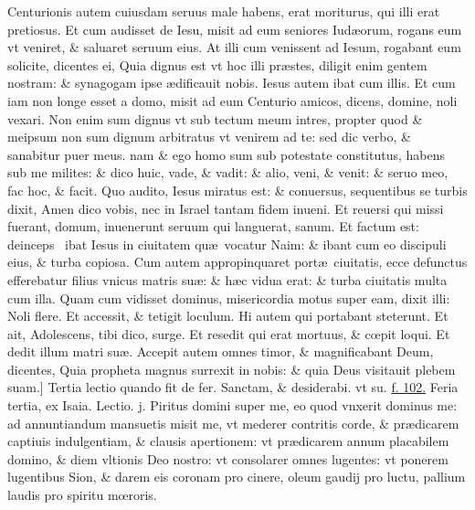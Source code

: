 \documentclass[a5paper,10pt]{book}
\def\leftmarginnote{%
	\lrmarginnote{\hskip -\marginparsep \hskip -6.5em}}
\def\rightmarginnote{%
	\lrmarginnote{\hskip\columnwidth \hskip -1em}}
\def\ae{æ}
\def\oe{œ}
\begin{document}
\begin{multicols*}{2}
Centurionis autem cuiusdam seruus male habens, erat moriturus, qui illi erat pretiosus.
Et cum audisset de Iesu, misit ad eum seniores Iud\ae orum, rogans eum vt veniret, \& saluaret seruum eius.
At illi cum venissent ad Iesum, rogabant eum solicite, dicentes ei, Quia dignus est vt hoc illi pr\ae stes, diligit enim gentem nostram: \& synagogam ipse \ae dificauit nobis.
Iesus autem ibat cum illis.
Et cum iam non longe esset a domo, misit ad eum Centurio amicos, dicens, domine, noli vexari.
Non enim sum dignus vt sub tectum meum intres, propter quod \& meipsum non sum dignum arbitratus vt venirem ad te: sed dic verbo, \& sanabitur puer meus. nam \& ego homo sum sub potestate constitutus, habens sub me milites: \& dico huic, vade, \& vadit: \& alio, veni, \& venit: \& seruo meo, fac hoc, \& facit.
Quo audito, Iesus miratus est: \& conuersus, sequentibus se turbis dixit, Amen dico vobis, nec in Israel tantam fidem inueni.
Et reuersi qui missi fuerant, domum, inuenerunt seruum qui languerat, sanum.
Et factum est: deinceps \textdagger \ ibat\leftmarginnote{\begin{flushright}B\end{flushright}} Iesus in ciuitatem qu\ae \ vocatur Naim: \& ibant cum eo discipuli eius, \& turba copiosa.
Cum autem appropinquaret port\ae \ ciuitatis, ecce defunctus efferebatur filius vnicus matris su\ae : \& h\ae c vidua erat: \& turba ciuitatis multa cum illa.
Quam cum vidisset dominus, misericordia motus super eam,
dixit illi: Noli flere.
Et accessit, \& tetigit loculum. Hi autem qui portabant steterunt. Et ait, Adolescens, tibi dico, surge. Et resedit qui erat mortuus, \& c\oe pit loqui. Et dedit illum matri su\ae .
Accepit autem omnes timor, \& magnificabant Deum, dicentes, Quia propheta magnus surrexit in nobis: \& quia Deus visitauit plebem suam.]
\newline \color{red} Tertia lectio quando fit de fer. \color{black} Sanctam, \& desiderabi. \color{red} vt su. \color{black} \hyperlink{page.102}{f. 102.}
\newline {} \color{red} \hypertarget{TUE-TERTIA-ADV}{Feria tertia,} ex Isaia. \hfill Lectio. j. \color{black}
\vspace{-.25em}
Piritus\rightmarginnote{c. 61.} domini super me, eo quod vnxerit dominus me: ad annuntiandum mansuetis misit me, vt mederer contritis corde, \& pr\ae dicarem captiuis indulgentiam, \& clausis apertionem: vt pr\ae dicarem annum placabilem domino, \& diem vltionis Deo nostro: vt consolarer omnes lugentes: vt ponerem lugentibus Sion, \& darem eis coronam pro cinere, oleum gaudij pro luctu, pallium laudis pro spiritu m\oe roris.

\end{multicols*}
\end{document}
